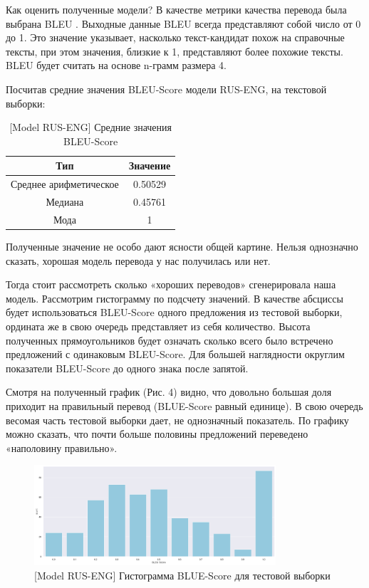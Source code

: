 \documentclass[a4paper,12pt]{article}
\begin{document}
    Как оценить полученные модели? В качестве метрики качества перевода была выбрана BLEU \cite{9}. Выходные данные BLEU всегда представляют собой число от 0 до 1. Это значение указывает, насколько текст-кандидат похож на справочные тексты, при этом значения, близкие к 1, представляют более похожие тексты. BLEU будет считать на основе n-грамм размера 4.
	
	Посчитав средние значения BLEU-Score модели RUS-ENG, на текстовой выборки:
	
	\begin{table}[h]
        \centering
        \begin{tabular}{|c|c|} 
            \hline
            \textbf{Тип} & \textbf{Значение} \\ 
            \hline
            Среднее арифметическое & 0.50529 \\ 
            \hline
            Медиана & 0.45761 \\ 
            \hline
            Мода & 1 \\
            \hline
        \end{tabular}
        \caption{ [Model RUS-ENG] Средние значения BLEU-Score}
    \end{table}
    
    Полученные значение не особо дают ясности общей картине. Нельзя однозначно сказать, хорошая модель перевода у нас получилась или нет. 
    
    Тогда стоит рассмотреть сколько «хороших переводов» сгенерировала наша модель. Рассмотрим гистограмму по подсчету значений. В качестве абсциссы будет использоваться BLEU-Score одного предложения из тестовой выборки, ордината же в свою очередь представляет из себя количество. Высота полученных прямоугольников будет означать сколько всего было встречено предложений с одинаковым BLEU-Score.  Для большей наглядности округлим показатели BLEU-Score до одного знака после запятой.
	
	Смотря на полученный график (Рис. 4) видно, что довольно большая доля приходит на правильный перевод (BLUE-Score равный единице). В свою очередь весомая часть тестовой выборки дает, не однозначный показатель. По графику можно сказать, что почти больше половины предложений переведено «наполовину правильно».
    	
    \begin{figure}[h]
		\centering
		\captionsetup{justification=centering}
		\includegraphics[width=0.8\textwidth]{img/RUS-ENG BLUE Score RUS-ENG Epochs-15.png}
		\caption{ [Model RUS-ENG] Гистограмма BLUE-Score для тестовой выборки}
	\end{figure}
	
\end{document}
